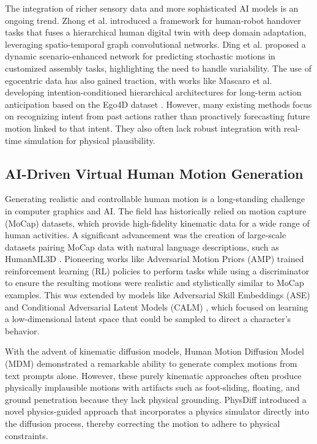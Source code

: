 \documentclass[biomimetics,article,submit,pdftex,moreauthors]{Definitions/mdpi}
\begin{document}
The integration of richer sensory data and more sophisticated AI models is an ongoing trend.
Zhong et al. \citep{Zhong2024} introduced a framework for human-robot handover tasks that fuses a hierarchical human digital twin with deep domain adaptation, leveraging spatio-temporal graph convolutional networks.
Ding et al. \citep{Ding2024} proposed a dynamic scenario-enhanced network for predicting stochastic motions in customized assembly tasks, highlighting the need to handle variability.
The use of egocentric data has also gained traction, with works like Mascaro et al.
\citep{Mascaro2022} developing intention-conditioned hierarchical architectures for long-term action anticipation based on the Ego4D dataset \citep{Grauman2021}.
However, many existing methods focus on recognizing intent from past actions rather than proactively forecasting future motion linked to that intent. They also often lack robust integration with real-time simulation for physical plausibility.
\subsection{AI-Driven Virtual Human Motion Generation}
Generating realistic and controllable human motion is a long-standing challenge in computer graphics and AI. The field has historically relied on motion capture (MoCap) datasets, which provide high-fidelity kinematic data for a wide range of human activities. A significant advancement was the creation of large-scale datasets pairing MoCap data with natural language descriptions, such as HumanML3D \citep{Guo_2022_CVPR}. Pioneering works like Adversarial Motion Priors (AMP) \citep{2021-TOG-AMP, Peng2021} trained reinforcement learning (RL) policies to perform tasks while using a discriminator to ensure the resulting motions were realistic and stylistically similar to MoCap examples. This was extended by models like Adversarial Skill Embeddings (ASE) \citep{2022-TOG-ASE} and Conditional Adversarial Latent Models (CALM) \citep{Tessler2023}, which focused on learning a low-dimensional latent space that could be sampled to direct a character's behavior.

With the advent of kinematic diffusion models, Human Motion Diffusion Model (MDM) \citep{tevet2023human}  demonstrated a remarkable ability to generate complex motions from text prompts alone. However, these purely kinematic approaches often produce physically implausible motions with artifacts such as foot-sliding, floating, and ground penetration because they lack physical grounding. PhysDiff \citep{Yuan2023} introduced a novel physics-guided approach that incorporates a physics simulator directly into the diffusion process, thereby correcting the motion to adhere to physical constraints.
\end{document}
